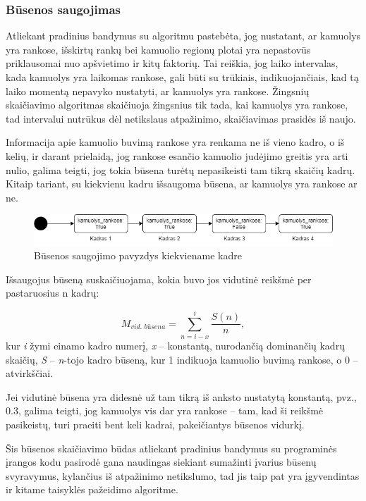 \documentclass{VUMIFPSbakalaurinis}
\begin{document}
\subsubsection{Būsenos saugojimas}
Atliekant pradinius bandymus su algoritmu pastebėta, jog nustatant, ar kamuolys yra rankose, išskirtų rankų bei kamuolio regionų plotai yra nepastovūs priklausomai nuo apšvietimo ir kitų faktorių. Tai reiškia, jog laiko intervalas, kada kamuolys yra laikomas rankose, gali būti su trūkiais, indikuojančiais, kad tą laiko momentą nepavyko nustatyti, ar kamuolys yra rankose. Žingsnių skaičiavimo algoritmas skaičiuoja žingsnius tik tada, kai kamuolys yra rankose, tad intervalui nutrūkus dėl netikslaus atpažinimo, skaičiavimas prasidės iš naujo. 

Informacija apie kamuolio buvimą rankose yra renkama ne iš vieno kadro, o iš kelių, ir darant prielaidą, jog rankose esančio kamuolio judėjimo greitis yra arti nulio, galima teigti, jog tokia būsena turėtų nepasikeisti tam tikrą skaičių kadrų. Kitaip tariant, su kiekvienu kadru išsaugoma būsena, ar kamuolys yra rankose ar ne.

\begin{figure}[H]
	\centering
	\includegraphics[scale=0.6]{img/state}
	\caption{Būsenos saugojimo pavyzdys kiekviename kadre}
	\label{img:state}
\end{figure}

Išsaugojus būseną suskaičiuojama, kokia buvo jos vidutinė reikšmė per pastaruosius n kadrų: 

\begin{equation}\label{eq:avg_state}
	M_{\textit{vid. būsena}} = \sum_{n=i-x}^{i} \frac{S(n)}{n},
\end{equation}
kur \textit{i} žymi einamo kadro numerį, \textit{x} – konstantą, nurodančią dominančių kadrų skaičių, \textit{S} – \textit{n}-tojo kadro būseną, kur 1 indikuoja kamuolio buvimą rankose, o 0 – atvirkščiai.

Jei vidutinė būsena yra didesnė už tam tikrą iš anksto nustatytą konstantą, pvz., 0.3, galima teigti, jog kamuolys vis dar yra rankose – tam, kad ši reikšmė pasikeistų, turi praeiti bent keli kadrai, pakeičiantys būsenos vidurkį. 

Šis būsenos skaičiavimo būdas atliekant pradinius bandymus su programinės įrangos kodu pasirodė gana naudingas siekiant sumažinti įvarius būsenų svyravymus, kylančius iš atpažinimo netikslumo, tad jis taip pat yra įgyvendintas ir kitame taisyklės pažeidimo algoritme. 
\end{document}
